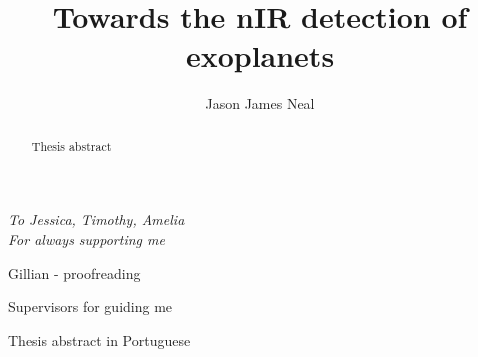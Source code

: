 \documentclass[fleqn]{fcup-thesis}
\author{Jason James Neal}
\title{Towards the nIR detection of exoplanets}
\begin{document}
	\begin{preliminary}

		\maketitle
		\cleardoublepage


		\begin{dedication}
			\centering \huge \itshape
			To Jessica, Timothy, Amelia\\For always supporting me
		\end{dedication}


		\begin{acknowledgements}

			Gillian - proofreading

			Supervisors for guiding me

			\vspace{7mm}


		\end{acknowledgements}



		\begin{abstract}

			Thesis abstract
		\end{abstract}

		\begin{abstract-pt}

			Thesis abstract in Portuguese
		\end{abstract-pt}


        \todototoc
		\listoftodos

		\tableofcontents
		\listoftables
		\listoffigures




		\begin{abbreviations}
			\begin{longtable}{ll}


\end{longtable}
\end{abbreviations}
\end{preliminary}
\end{document}
